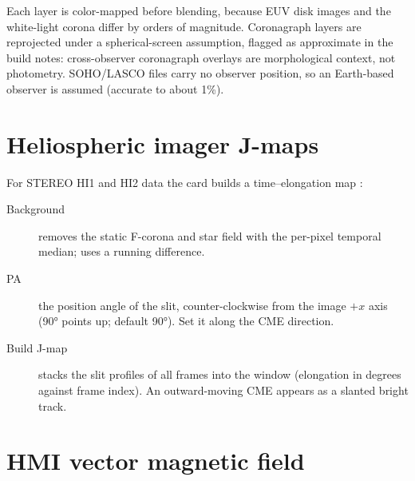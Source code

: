 \begin{note}
  Each layer is color-mapped before blending, because EUV disk images and the white-light
  corona differ by orders of magnitude. Coronagraph layers are reprojected under a
  spherical-screen assumption, flagged as approximate in the build notes: cross-observer
  coronagraph overlays are morphological context, not photometry. SOHO/LASCO files carry no
  observer position, so an Earth-based observer is assumed (accurate to about 1\%).
\end{note}

\section{Heliospheric imager J-maps}
\label{sec:jmap}

For STEREO HI1 and HI2 data the  card builds a
time--elongation map \parencite{sheeley1999}:
\begin{description}
  \item[Background]  removes the static F-corona and star field with
    the per-pixel temporal median;  uses a running difference.
  \item[PA] the position angle of the slit, counter-clockwise from the image \(+x\) axis
    (90° points up; default 90°). Set it along the CME direction.
  \item[Build J-map] stacks the slit profiles of all frames into the  window
    (elongation in degrees against frame index). An outward-moving CME appears as a slanted
    bright track.
\end{description}

\section{HMI vector magnetic field}
\label{sec:hmi-vector}

